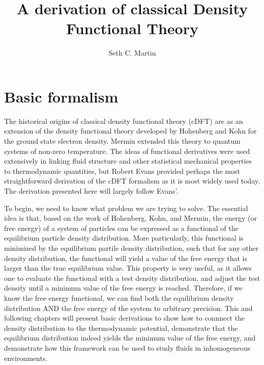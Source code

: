 \documentclass{report}
\author{Seth C. Martin}
\title{A derivation of classical Density Functional Theory}
\begin{document}
\maketitle
\chapter{Basic formalism}
The historical origins of classical density functional theory (cDFT) are as an extension of the density functional theory developed by Hohenberg and Kohn\cite{Hohenberg} for the ground state electron density. Mermin\cite{Mermin} extended this theory to quantum systems of non-zero temperature. The ideas of functional derivatives were used extensively in linking fluid structure and other statistical mechanical properties to thermodynamic quantities, but Robert Evans provided perhaps the most straightforward derivation of the cDFT formalism as it is most widely used today.\cite{Evans} The derivation presented here will largely follow Evans'.

To begin, we need to know what problem we are trying to solve. The essential idea is that, based on the work of Hohenberg, Kohn, and Mermin, the energy (or free energy) of a system of particles can be expressed as a functional of the equilibrium particle density distribution. More particularly, this functional is minimized by the equilibrium partile density distribution, such that for any other density distribution, the functional will yield a value of the free energy that is larger than the true equilibrium value. This property is very useful, as it allows one to evaluate the functional with a test density distribution, and adjust the test density until a minimum value of the free energy is reached. Therefore, if we know the free energy functional, we can find both the equilibrium density distribution AND the free energy of the system to arbitrary precision. This and following chapters will present basic derivations to show how to connnect the density distribution to the thermodynamic potential, demonstrate that the equilibrium distribution indeed yields the minimum value of the free energy, and demonstrate how this framework can be used to study fluids in inhomogeneous environments.
\end{document}
